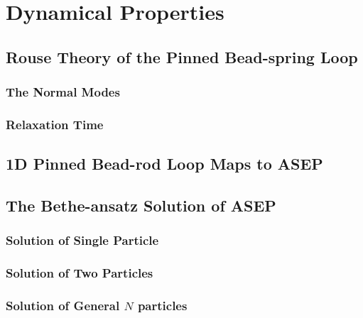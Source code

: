 \chapter{Dynamical Properties}
\graphicspath{{Chapter4/Figs/}}

\section{Rouse Theory of the Pinned Bead-spring Loop}
\label{sec:rouse_theory_of_the_pinned_bead_spring_loop}

\subsection{The Normal Modes}
\label{sub:the_normal_modes}

\subsection{Relaxation Time}
\label{sub:relaxation_time}




\section{1D Pinned Bead-rod Loop Maps to ASEP}
\label{sec:1d_pinned_bead_rod_loop_maps_to_asep}


\section{The Bethe-ansatz Solution of ASEP}
\label{sec:the_bethe_ansatz_solution_of_asep}

\subsection{Solution of Single Particle}
\label{sub:solution_of_single_particle}

\subsection{Solution of Two Particles}
\label{sub:solution_of_two_particles}

\subsection{Solution of General $N$ particles}
\label{sub:solution_of_general_n_particles}

